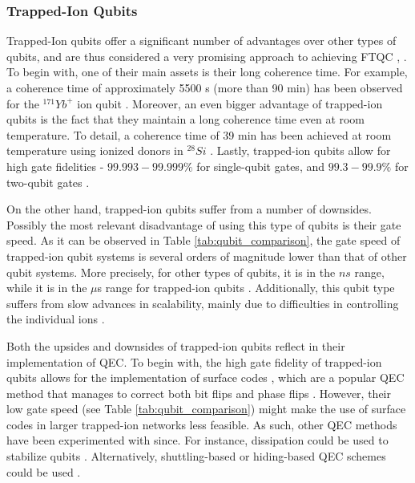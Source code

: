 \subsubsection{Trapped-Ion Qubits}
Trapped-Ion qubits offer a significant number of advantages over other types of qubits, and are thus considered a very promising approach to achieving FTQC \cite{schafer2018fast}, \cite{bruzewicz2019trapped}. To begin with, one of their main assets is their long coherence time. For example, a coherence time of approximately 5500 s (more than 90 min) has been observed for the $^{171}Yb^{+}$ ion qubit \cite{wang2021single}. Moreover, an even bigger advantage of trapped-ion qubits is the fact that they maintain a long coherence time even at room temperature. To detail, a coherence time of 39 min has been achieved at room temperature using ionized donors in $^{28}Si$ \cite{saeedi2013room}. Lastly, trapped-ion qubits allow for high gate fidelities - $99.993-99.999\%$ for single-qubit gates, and $99.3-99.9\%$ for two-qubit gates \cite{bruzewicz2019trapped}. \par

On the other hand, trapped-ion qubits suffer from a number of downsides. Possibly the most relevant disadvantage of using this type of qubits is their gate speed. As it can be observed in Table \ref{tab:qubit_comparison}, the gate speed of trapped-ion qubit systems is several orders of magnitude lower than that of other qubit systems. More precisely, for other types of qubits, it is in the $ns$ range, while it is in the $\mu$s range for trapped-ion qubits \cite{bruzewicz2019trapped}. Additionally, this qubit type suffers from slow advances in scalability, mainly due to difficulties in controlling the individual ions \cite{bruzewicz2019trapped}.  \par

Both the upsides and downsides of trapped-ion qubits reflect in their implementation of QEC. To begin with, the high gate fidelity of trapped-ion qubits allows for the implementation of surface codes \cite{bruzewicz2019trapped}, which are a popular QEC method that manages to correct both bit flips and phase flips \cite{fowler2012surface}. However, their low gate speed (see Table \ref{tab:qubit_comparison}) might make the use of surface codes in larger trapped-ion networks less feasible. As such, other QEC methods have been experimented with since. For instance, dissipation could be used to stabilize qubits \cite{reiter2017dissipative}. Alternatively, shuttling-based or hiding-based QEC schemes could be used \cite{bermudez2017assessing}. \par



